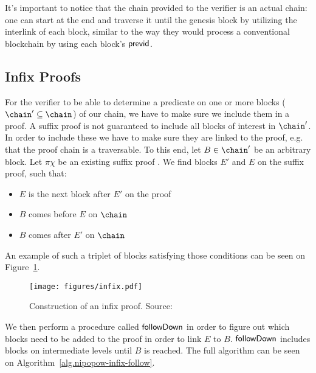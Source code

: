 It's important to notice that the chain provided to the verifier is an actual chain: one can start at the end and traverse it until the genesis block by utilizing the interlink of each block, similar to the way they would process a conventional blockchain by using each block's $\sf previd$.


\subsection{Infix Proofs}
For the verifier to be able to determine a predicate on one or more blocks ($\chain' \subseteq \chain$) of our chain, we have to make sure we include them in a proof. A suffix proof is not guaranteed to include all blocks of interest in $\chain'$. In order to include these we have to make sure they are linked to the proof, e.g. that the proof chain is a traversable. To this end, let $B \in \chain'$ be an arbitrary block. Let $\pi\chi$ be an existing suffix proof . We find blocks $E'$ and $E$ on the suffix proof, such that:

\begin{itemize}
  \item $E$ is the next block after $E'$ on the proof
  \item $B$ comes before $E$ on $\chain$
  \item $B$ comes after $E'$ on $\chain$
\end{itemize}

An example of such a triplet of blocks satisfying those conditions can be seen on Figure~\ref{fig:infix-proof}.

\begin{figure}
  \centering
  \texttt{[image: figures/infix.pdf]}
  \caption{Construction of an infix proof.  Source:~\cite{nipopows}}
  \label{fig:infix-proof}
\end{figure}

We then perform a procedure called $\sf followDown$ in order to figure out which blocks need to be added to the proof in order to link $E$ to $B$. $\sf followDown$ includes blocks on intermediate levels until $B$ is reached. The full algorithm can be seen on Algorithm~\ref{alg.nipopow-infix-follow}.



